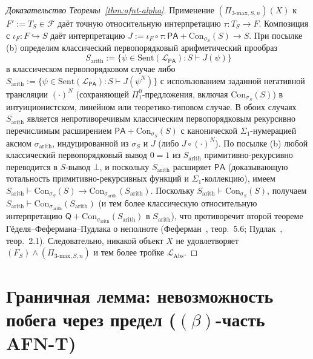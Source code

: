 \documentclass[11pt]{article}
\theoremstyle{plain}
\theoremstyle{definition}
\newcommand{\cF}{\mathcal{F}}
\newcommand{\LAbs}{\mathcal{L}_{\mathrm{Abs}}}
\newcommand{\Con}{\mathrm{Con}}
\newcommand{\PA}{\mathsf{PA}}
\begin{document}
\begin{proof}[Доказательство Теоремы~\ref{thm:afnt-alpha}]
Применение $(\Pi_{3\text{-max}, S, n})(X)$ к $F' := T_S \in \cF$ даёт точную относительную интерпретацию $\tau : T_S \to F$. Композиция с $\iota_F : F \hookrightarrow S$ даёт интерпретацию $J := \iota_F \circ \tau : \PA + \Con_{\sigma_S}(S) \to S$. При посылке (b) определим классический первопорядковый арифметический прообраз
\[
  S_{\mathrm{arith}} := \{\psi \in \mathrm{Sent}(\mathcal{L}_{\PA}) : S \vdash J(\psi)\}
\]
в классическом первопорядковом случае либо $S_{\mathrm{arith}} := \{\psi \in \mathrm{Sent}(\mathcal{L}_{\PA}) : S \vdash J(\psi^N)\}$ с использованием заданной негативной трансляции $(\cdot)^N$ (сохраняющей $\Pi_1^0$-предложения, включая $\Con_{\sigma_S}(S)$) в интуиционистском, линейном или теоретико-типовом случае. В обоих случаях $S_{\mathrm{arith}}$ является непротиворечивым классическим первопорядковым рекурсивно перечислимым расширением $\PA + \Con_{\sigma_S}(S)$ с канонической $\Sigma_1$-нумерацией аксиом $\sigma_{\mathrm{arith}}$, индуцированной из $\sigma_S$ и $J$ (либо $J \circ (\cdot)^N$). По посылке (b) любой классический первопорядковый вывод $0 = 1$ из $S_{\mathrm{arith}}$ примитивно-рекурсивно переводится в $S$-вывод $\bot$, и поскольку $S_{\mathrm{arith}}$ расширяет $\PA$ (доказывающую тотальность примитивно-рекурсивных функций и $\Sigma_1$-коллекцию), имеем $S_{\mathrm{arith}} \vdash \Con_{\sigma_S}(S) \to \Con_{\sigma_{\mathrm{arith}}}(S_{\mathrm{arith}})$. Поскольку $S_{\mathrm{arith}} \vdash \Con_{\sigma_S}(S)$, получаем $S_{\mathrm{arith}} \vdash \Con_{\sigma_{\mathrm{arith}}}(S_{\mathrm{arith}})$ (и тем более классическую относительную интерпретацию $\mathsf{Q} + \Con_{\sigma_{\mathrm{arith}}}(S_{\mathrm{arith}})$ в $S_{\mathrm{arith}}$), что противоречит второй теореме Гёделя--Фефермана--Пудлака о неполноте (Феферман~\cite{Feferman1960}, теор.~5.6; Пудлак~\cite{Pudlak1985}, теор.~2.1). Следовательно, никакой объект $X$ не удовлетворяет $(F_S) \wedge (\Pi_{3\text{-max}, S, n})$ и тем более тройке $\LAbs$.
\end{proof}

\section{\texorpdfstring{Граничная лемма: невозможность побега через предел ($(\beta)$-часть AFN-T)}{Граничная лемма: невозможность побега через предел ((beta)-часть AFN-T)}}\label{sec:afnt-beta}
\end{document}
